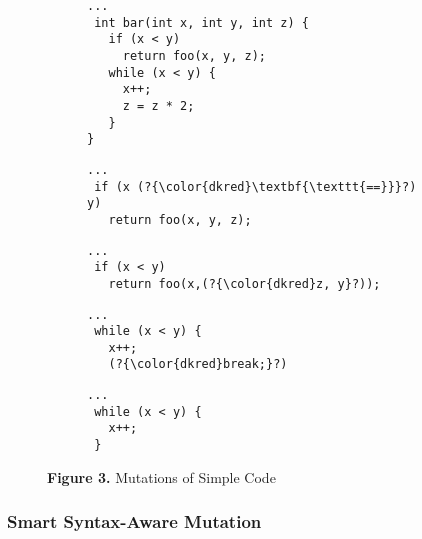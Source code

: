 \begin{figure}[h!]
\begin{subfigure}{.65\columnwidth}
\begin{lstlisting}[basicstyle=\scriptsize\ttfamily,numbers=none,xleftmargin=0.7em,xrightmargin=.7em]
...
 int bar(int x, int y, int z) {
   if (x < y)
     return foo(x, y, z);
   while (x < y) {
     x++;
     z = z * 2;
   }
}
\end{lstlisting}
\end{subfigure}
\begin{subfigure}{.45\columnwidth}
\begin{lstlisting}[basicstyle=\scriptsize\ttfamily,numbers=none,xleftmargin=0.7em,xrightmargin=.7em]
...
 if (x (?{\color{dkred}\textbf{\texttt{==}}}?) y)
   return foo(x, y, z);
\end{lstlisting}
\end{subfigure}
\hspace{.2em}
\begin{subfigure}{.45\columnwidth}
\begin{lstlisting}[basicstyle=\scriptsize\ttfamily,numbers=none,xleftmargin=0.7em,xrightmargin=.7em]
...
 if (x < y)
   return foo(x,(?{\color{dkred}z, y}?));
\end{lstlisting}
\end{subfigure}
\begin{subfigure}{.45\columnwidth}
\begin{lstlisting}[basicstyle=\scriptsize\ttfamily,numbers=none,xleftmargin=0.7em,xrightmargin=.7em]
...
 while (x < y) {
   x++;
   (?{\color{dkred}break;}?)
\end{lstlisting}
\end{subfigure}
\hspace{.2em}
\begin{subfigure}{.45\columnwidth}
\begin{lstlisting}[basicstyle=\scriptsize\ttfamily,numbers=none,xleftmargin=0.7em,xrightmargin=.7em]
...
 while (x < y) {
   x++; 
 }
\end{lstlisting}
\end{subfigure}
\label{fig:fopexample}
\caption*{\normalsize\textbf{Figure 3.} Mutations of  Simple Code} %
\end{figure}

\subsubsection{Smart Syntax-Aware Mutation}
\label{strat-syntax-aware}

